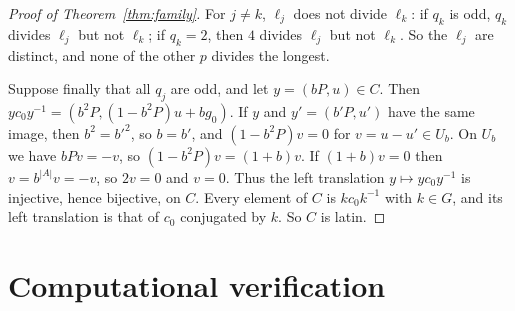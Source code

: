 \documentclass[11pt]{article}
\begin{document}
\begin{proof}[Proof of Theorem~\ref{thm:family}]
For $j\ne k$, $\ell_j$ does not divide $\ell_k$: if $q_k$ is odd, $q_k$
divides $\ell_j$ but not $\ell_k$; if $q_k=2$, then $4$ divides $\ell_j$
but not $\ell_k$. So the $\ell_j$ are distinct, and none of the other $p$
divides the longest.

Suppose finally that all $q_j$ are odd, and let $y=(bP,u)\in C$. Then
$yc_0y^{-1}=(b^2P,(1-b^2P)u+bg_0)$. If $y$ and $y'=(b'P,u')$ have the same
image, then $b^2=b'^2$, so $b=b'$, and $(1-b^2P)v=0$ for $v=u-u'\in U_b$.
On $U_b$ we have $bPv=-v$, so $(1-b^2P)v=(1+b)v$. If $(1+b)v=0$ then
$v=b^{|A|}v=-v$, so $2v=0$ and $v=0$. Thus the left translation $y\mapsto
yc_0y^{-1}$ is injective, hence bijective, on $C$. Every element of $C$ is
$kc_0k^{-1}$ with $k\in G$, and its left translation is that of $c_0$
conjugated by $k$. So $C$ is latin.
\end{proof}


\section{Computational verification}\label{sec:verification}
\end{document}
